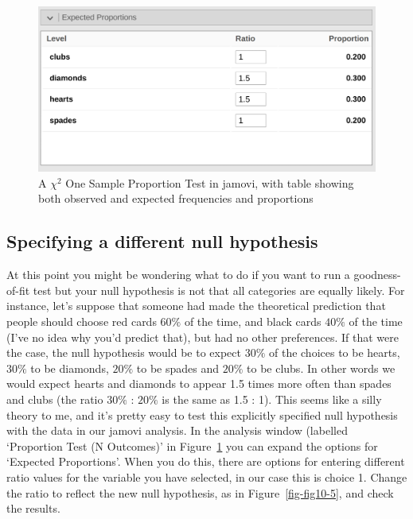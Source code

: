 \documentclass[
  a4paper,
]{book}
\begin{document}
\begin{figure}

\includegraphics[width=1\textwidth,height=\textheight]{images/fig10-4.png} \hfill{}

\caption{\label{fig-fig10-4}A \(\chi^2\) One Sample Proportion Test in
jamovi, with table showing both observed and expected frequencies and
proportions}

\end{figure}

\hypertarget{specifying-a-different-null-hypothesis}{%
\subsection{Specifying a different null
hypothesis}\label{specifying-a-different-null-hypothesis}}

At this point you might be wondering what to do if you want to run a
goodness-of-fit test but your null hypothesis is not that all categories
are equally likely. For instance, let's suppose that someone had made
the theoretical prediction that people should choose red cards \(60\%\)
of the time, and black cards \(40\%\) of the time (I've no idea why
you'd predict that), but had no other preferences. If that were the
case, the null hypothesis would be to expect \(30\%\) of the choices to
be hearts, \(30\%\) to be diamonds, \(20\%\) to be spades and \(20\%\)
to be clubs. In other words we would expect hearts and diamonds to
appear 1.5 times more often than spades and clubs (the ratio \(30\%\) :
\(20\%\) is the same as 1.5 : 1). This seems like a silly theory to me,
and it's pretty easy to test this explicitly specified null hypothesis
with the data in our jamovi analysis. In the analysis window (labelled
`Proportion Test (N Outcomes)' in Figure~\ref{fig-fig10-4} you can
expand the options for `Expected Proportions'. When you do this, there
are options for entering different ratio values for the variable you
have selected, in our case this is choice 1. Change the ratio to reflect
the new null hypothesis, as in Figure~\ref{fig-fig10-5}, and check the
results.
\end{document}
